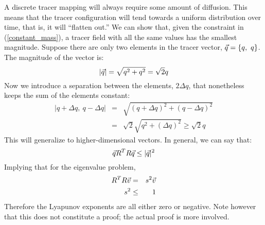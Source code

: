 A discrete tracer mapping will always require some 
amount of diffusion.  This means that the tracer configuration will 
tend towards a uniform distribution over time, 
that is, it will ``flatten out.''  We can
show that, given the constraint in (\ref{constant_mass}), 
a tracer field with all the same values has the smallest magnitude.  
Suppose there are only two elements in the 
tracer vector, $\vec q=\lbrace q,~q \rbrace$.  The magnitude of the vector is:
\begin{equation}
|\vec q|=\sqrt{q^2+q^2}=\sqrt{2} q
\end{equation}
Now we introduce a separation between the elements, $2\Delta q$, that 
nonetheless keeps the sum of the elements constant:
\begin{eqnarray}
|q+\Delta q,~q-\Delta q| & = & \sqrt{(q+\Delta q)^2+(q-\Delta q)^2} \\
& = & \sqrt{2}\sqrt{q^2+(\Delta q)^2} \ge \sqrt{2} q
\end{eqnarray}
This will generalize to higher-dimensional vectors.  In general, we can
say that:
\begin{equation}
\vec q R^T R \vec q \le | \vec q |^2
\label{tracer_map_inequality}
\end{equation}
Implying that for the eigenvalue problem,
\begin{eqnarray}
R^T R \vec v & = & s^2 \vec v \nonumber\\
s^2 & \le & 1 \label{SV_inequality}
\end{eqnarray}
Therefore the Lyapunov exponents are all
either zero or negative.
Note however that this does not constitute a proof; the actual proof is more 
involved.

